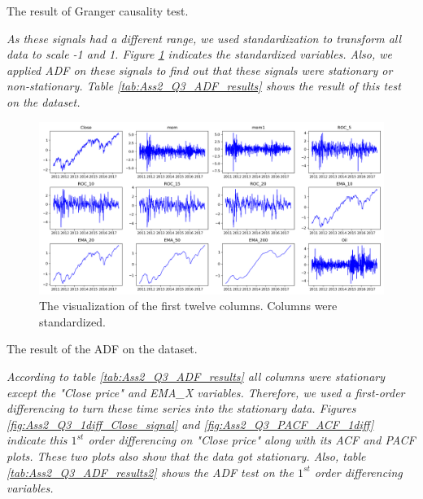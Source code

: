 \begin{table}[H]
\centering
\caption{The result of Granger causality test.}
\label{tab:Ass2_Q3_Granger_results1}

\end{table}

\textit{As these signals had a different range, we used standardization to transform all data to scale -1 and 1. Figure \ref{fig:Ass2_Q3_standard_data} indicates the standardized variables. Also, we applied \gls{ADF} on these signals to find out that these signals were stationary or non-stationary. Table \ref{tab:Ass2_Q3_ADF_results} shows the result of this test on the dataset.}

\begin{figure}[H]
    \centering
    \begin{minipage}[b]{1\textwidth}
        \includegraphics[width=\textwidth]{figures/Ass2/Ass2_Q4_standard_data.png}
    \end{minipage}
    \caption{The visualization of the first twelve columns. Columns were standardized.}
    \label{fig:Ass2_Q3_standard_data}
\end{figure}



\begin{table}[H]
\centering
\caption{The result of the \gls{ADF} on the dataset.}
\label{tab:Ass2_Q3_ADF_results}

\end{table}

\textit{According to table \ref{tab:Ass2_Q3_ADF_results} all columns were stationary except the "Close price" and EMA\_X variables. Therefore, 
we used a first-order differencing to turn these time series into the stationary data. Figures \ref{fig:Ass2_Q3_1diff_Close_signal} and \ref{fig:Ass2_Q3_PACF_ACF_1diff} indicate this $1^{st}$ order differencing on "Close price" along with its \gls{ACF} and \gls{PACF} plots. These two plots also show that the data got stationary. Also, table \ref{tab:Ass2_Q3_ADF_results2} shows the ADF test on the $1^{st}$ order differencing variables.}

